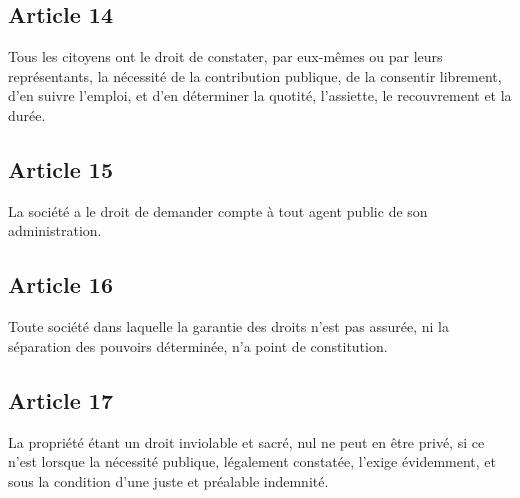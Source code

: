 \documentclass[11pt,a4paper]{article}
\begin{document}
\subsection*{Article 14}

Tous les citoyens ont le droit de constater, par eux-mêmes ou par leurs représentants, la nécessité de la contribution publique, de la consentir librement, d'en suivre l'emploi, et d'en déterminer la quotité, l'assiette, le recouvrement et la durée.

\subsection*{Article 15}

La société a le droit de demander compte à tout agent public de son administration.

\subsection*{Article 16}

Toute société dans laquelle la garantie des droits n'est pas assurée, ni la séparation des pouvoirs déterminée, n'a point de constitution.

\subsection*{Article 17}

La propriété étant un droit inviolable et sacré, nul ne peut en être privé, si ce n'est lorsque la nécessité publique, légalement constatée, l'exige évidemment, et sous la condition d'une juste et préalable indemnité.
\end{document}
